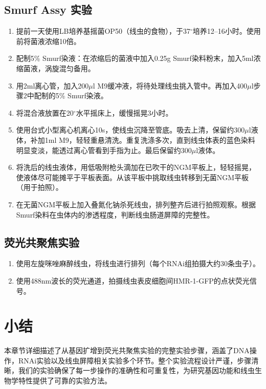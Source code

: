\subsection{Smurf Assy 实验}

\begin{enumerate}[itemsep=0.1em]
  \item 提前一天使用LB培养基摇菌OP50（线虫的食物），于37$^\circ$培养12–16小时。使用前将菌液浓缩10倍。
  \item 配制5\% Smurf染液：在浓缩后的菌液中加入0.25g Smurf染料粉末，加入5ml浓缩菌液，涡旋混匀备用。
  \item 用2ml离心管，加入200$\mu$l M9缓冲液，将待处理线虫挑入管中。再加入400$\mu$l步骤2中配制的5\% Smurf染液。
  \item 将混合液放置在20$^\circ$水平摇床上，缓慢摇晃3小时。
  \item 使用台式小型离心机离心10s，使线虫沉降至管底。吸去上清，保留约300$\mu$l液体，补加1ml M9，轻轻重悬清洗。重复洗涤多次，直到线虫体表的蓝色染料明显变淡，能透过离心管看到手指为止。最后保留约300$\mu$l液体。
  \item 将洗后的线虫液体，用低吸附枪头滴加在已吹干的NGM平板上，轻轻摇晃，使液体尽可能摊平于平板表面。从该平板中挑取线虫转移到无菌NGM平板（用于拍照）。
  \item 在无菌NGM平板上加入叠氮化钠杀死线虫，排列整齐后进行拍照观察。根据Smurf染料在虫体内的渗透程度，判断线虫肠道屏障的完整性。
\end{enumerate}

\subsection{荧光共聚焦实验}


\begin{enumerate}[itemsep=0.1em]
\item 使用左旋咪唑麻醉线虫，将线虫进行排列（每个RNAi组拍摄大约30条虫子）。
\item 使用488nm波长的荧光通道，拍摄线虫表皮细胞间HMR-1-GFP的点状荧光信号。
\end{enumerate}

\section{小结}

本章节详细描述了从基因扩增到荧光共聚焦实验的完整实验步骤，涵盖了DNA操作，RNAi实验以及线虫屏障相关实验多个环节。整个实验流程设计严谨，步骤清晰，我们的实验确保了每一步操作的准确性和可重复性，为研究基因功能和线虫生物学特性提供了可靠的实验方法。

